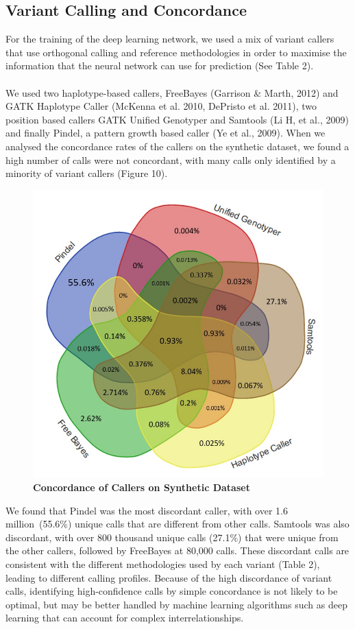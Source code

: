 \documentclass{article}
\begin{document}
\subsection{Variant Calling and Concordance}
For the training of the deep learning network, we used a mix of variant callers that use orthogonal calling and reference methodologies in order to maximise the information that the neural network can use for prediction (See Table 2).\\\\
We used two haplotype-based callers, FreeBayes (Garrison \& Marth, 2012) and GATK Haplotype Caller (McKenna et al. 2010, DePristo et al. 2011), two position based callers GATK Unified Genotyper and Samtools (Li H, et al., 2009) and finally Pindel, a pattern growth based caller (Ye et al., 2009). When we analysed the concordance rates of the callers on the synthetic dataset, we found a high number of calls were not concordant, with many calls only identified by a minority of variant callers (Figure 10).
\begin{figure}[H]
\includegraphics[width=\textwidth]{venndiagram.jpg}
\centering
\caption{\textbf{Concordance of Callers on Synthetic Dataset}}
\end{figure} 
We found that Pindel was the most discordant caller, with over 1.6 million\ (55.6\%) unique calls that are different from other calls. Samtools was also discordant, with over 800 thousand unique calls (27.1\%) that were unique from the other callers, followed by FreeBayes at 80,000 calls. These discordant calls are consistent with the different methodologies used by each variant (Table 2), leading to different calling profiles. Because of the high discordance of variant calls, identifying high-confidence calls by simple concordance is not likely to be optimal, but may be better handled by machine learning algorithms such as deep learning that can account for complex interrelationships.\\
\end{document}
